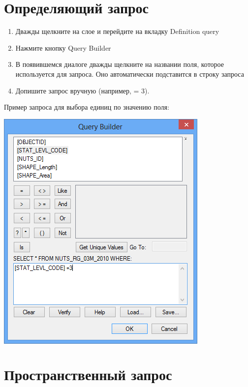 \documentclass[]{book}
\theoremstyle{definition}
\theoremstyle{definition}
\theoremstyle{definition}
\theoremstyle{remark}
\begin{document}
\hypertarget{-}{%
\section{Определяющий запрос}\label{-}}

\begin{enumerate}
\def\labelenumi{\arabic{enumi}.}
\item
  Дважды щелкните на слое и перейдите на вкладку Definition query
\item
  Нажмите кнопку Query Builder
\item
  В появившемся диалоге дважды щелкните на названии поля, которое
  используется для запроса. Оно автоматически подставится в строку
  запроса
\item
  Допишите запрос вручную (например, = 3).
\end{enumerate}

Пример запроса для выбора единиц по значению поля:

\includegraphics{images/Appendix/image73.png}

\hypertarget{-}{%
\section{Пространственный запрос}\label{-}}
\end{document}
